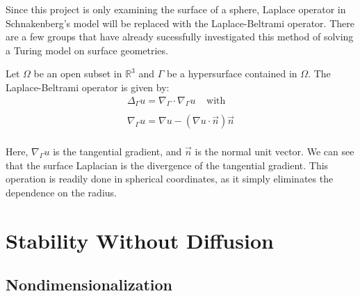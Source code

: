\documentclass[12pt]{article}
\begin{document}
Since this project is only examining the surface of a sphere, Laplace operator in Schnakenberg's model will be replaced with the Laplace-Beltrami operator. There are a few groups that have already sucessfully investigated this method of solving a Turing model on surface geometries.\cite{Dziuk1988}\cite{Shubin2001}\cite{Barreira2011} 

Let $\Omega$ be an open subset in $\mathbb{R}^3$ and $\Gamma$ be a hypersurface contained in $\Omega$. The Laplace-Beltrami operator is given by:
\\
\begin{equation}
    \label{Laplace-Beltrami}
    \begin{aligned}
        \Delta_\Gamma u = \nabla_\Gamma\cdot\nabla_\Gamma u ~~~~~ \text{with} \\
        \\
        \nabla_\Gamma u = \nabla u-(\nabla u\cdot\vec{n})\vec{n}
    \end{aligned}
\end{equation}
\\
\noindent Here, $\nabla_\Gamma u$ is the tangential gradient, and $\vec{n}$ is the normal unit vector. We can see that the surface Laplacian is the divergence of the tangential gradient. This operation is readily done in spherical coordinates, as it simply eliminates the dependence on the radius.

\pagebreak
\section{Stability Without Diffusion}\label{stability}

\subsection{Nondimensionalization}\label{nondimensionalization}
\end{document}
